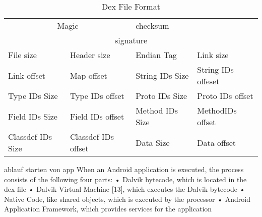\begin{table}[]
\centering
\caption{Dex File Format}
\label{table:foundation-forensic-dex}
\begin{tabular}{|l|l|l|l}
\hline
\multicolumn{2}{|c|}{Magic}             & checksum        & \multicolumn{1}{c|}{}                   \\ \cline{1-3}
\multicolumn{4}{|c|}{signature}                                                                     \\ \hline
File size         & Header size         & Endian Tag      & \multicolumn{1}{l|}{Link size}          \\ \hline
Link offset       & Map offset          & String IDs Size & \multicolumn{1}{l|}{String IDs offeset} \\ \hline
Type IDs Size     & Type IDs offset     & Proto IDs Size  & \multicolumn{1}{l|}{Proto IDs offset}   \\ \hline
Field IDs Size    & Field IDs offset    & Method IDs Size & \multicolumn{1}{l|}{MethodIDs offset}   \\ \hline
Classdef IDs Size & Classdef IDs offset & Data Size       & \multicolumn{1}{l|}{Data offset}        \\ \hline
\end{tabular}
\end{table}

ablauf starten von app\newline
When an Android application is executed, the process consists of the following four parts:
• Dalvik bytecode, which is located in the dex file
• Dalvik Virtual Machine [13], which executes the Dalvik bytecode
• Native Code, like shared objects, which is executed by the processor
• Android Application Framework, which provides services for the application\newline
